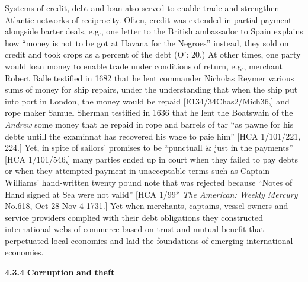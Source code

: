Systems of credit, debt and loan also served to enable trade and strengthen Atlantic networks of reciprocity. Often, credit was extended in partial payment alongside barter deals, e.g., one letter to the British ambassador to Spain explains how “money is not to be got at Havana for the Negroes” instead, they sold on credit and took crops as a percent of the debt (O’\citealt{Malley2016}: 20.) At other times, one party would loan money to enable trade under conditions of return, e.g., merchant Robert Balle testified in 1682 that he lent commander Nicholas Reymer various sums of money for ship repairs, under the understanding that when the ship put into port in London, the money would be repaid [E134/34Chas2/Mich36,] and rope maker Samuel Sherman testified in 1636 that he lent the Boatswain of the \textit{Andrew} some money that he repaid in rope and barrels of tar “as pawne for his debte untill the examinnat has recovered his wage to paie him” [HCA 1/101/221, 224.] Yet, in spite of sailors’ promises to be “punctuall \& just in the payments” [HCA 1/101/546,] many parties ended up in court when they failed to pay debts or when they attempted payment in unacceptable terms such as Captain Williams’ hand-written twenty pound note that was rejected because “Notes of Hand signed at Sea were not valid” [HCA 1/99* \textit{The American: Weekly Mercury} No.618, Oct 28-Nov 4 1731.] Yet when merchants, captains, vessel owners and service providers complied with their debt obligations they constructed international webs of commerce based on trust and mutual benefit that perpetuated local economies and laid the foundations of emerging international economies. 

  \textbf{4.3.4} \textbf{Corruption} \textbf{and} \textbf{theft}


